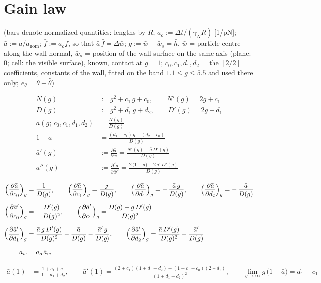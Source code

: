 \documentclass[11pt,a4paper,fontset=none]{ctexart}
\newcommand{\ba}{\bar{a}}
\newcommand{\bw}{\bar{w}}
\newcommand{\dW}{\Delta\bw}
\newcommand{\ap}{\ba'}
\newcommand{\app}{\ba''}
\begin{document}
\section{Gain law}

(bars denote normalized quantities: lengths by $R$; $a_o := \Delta t/(\gamma_N R)$ [1/pN]; $\ba := a/a_{\mathrm{nom}}$;
$\bar f := a_o f$, so that $\ba\,\bar f = \dW$; $g := \bw - \bw_s = \bar h$, $\bw$ = particle centre along the wall normal,
$\bw_s$ = position of the wall surface on the same axis (plane: 0; cell: the visible surface), known, contact at $g = 1$;
$c_0, c_1, d_1, d_2$ = the $[2/2]$ coefficients, constants of the wall, fitted on the band $1.1 \le g \le 5.5$ and used there only;
$e_\theta = \theta - \hat\theta$)

\begin{align*}
N(g)   &:= g^{2} + c_1\,g + c_0, \qquad N'(g) = 2g + c_1 \\
D(g)   &:= g^{2} + d_1\,g + d_2, \qquad D'(g) = 2g + d_1 \\[4pt]
\ba(g;\, c_0, c_1, d_1, d_2) &= \frac{N(g)}{D(g)} \\[4pt]
1 - \ba &= \frac{(d_1 - c_1)\,g + (d_2 - c_0)}{D(g)} \\[4pt]
\ap(g)  &:= \frac{\partial\ba}{\partial\bw} = \frac{N'(g) - \ba\,D'(g)}{D(g)} \\[4pt]
\app(g) &:= \frac{\partial^{2}\ba}{\partial\bw^{2}} = \frac{2\,\bigl(1 - \ba\bigr) - 2\,\ap\,D'(g)}{D(g)}
\end{align*}

\begin{align*}
\Bigl(\frac{\partial\ba}{\partial c_0}\Bigr)_{g} &= \frac{1}{D(g)}, \qquad
\Bigl(\frac{\partial\ba}{\partial c_1}\Bigr)_{g} = \frac{g}{D(g)}, \qquad
\Bigl(\frac{\partial\ba}{\partial d_1}\Bigr)_{g} = -\,\frac{\ba\,g}{D(g)}, \qquad
\Bigl(\frac{\partial\ba}{\partial d_2}\Bigr)_{g} = -\,\frac{\ba}{D(g)} \\[6pt]
\Bigl(\frac{\partial\ap}{\partial c_0}\Bigr)_{g} &= -\,\frac{D'(g)}{D(g)^{2}}, \qquad
\Bigl(\frac{\partial\ap}{\partial c_1}\Bigr)_{g} = \frac{D(g) - g\,D'(g)}{D(g)^{2}} \\[6pt]
\Bigl(\frac{\partial\ap}{\partial d_1}\Bigr)_{g} &= \frac{\ba\,g\,D'(g)}{D(g)^{2}} - \frac{\ba}{D(g)} - \frac{\ap\,g}{D(g)}, \qquad
\Bigl(\frac{\partial\ap}{\partial d_2}\Bigr)_{g} = \frac{\ba\,D'(g)}{D(g)^{2}} - \frac{\ap}{D(g)} \\[6pt]
a_w &= a_o\,\ba_w
\end{align*}

\begin{align*}
\ba(1) &= \frac{1 + c_1 + c_0}{1 + d_1 + d_2}, \qquad
\ap(1) = \frac{(2 + c_1)(1 + d_1 + d_2) - (1 + c_1 + c_0)(2 + d_1)}{(1 + d_1 + d_2)^{2}}, \qquad
\lim_{g\to\infty} g\,\bigl(1 - \ba\bigr) = d_1 - c_1
\end{align*}
\end{document}
